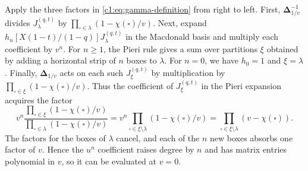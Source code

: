 \documentclass[12pt,reqno,a4paper]{amsart}
\numberwithin{equation}{section}
\numberwithin{figure}{section}
\theoremstyle{plain}
\theoremstyle{definition}
\begin{document}
Apply the three factors in \eqref{c1:eq:gamma-definition} from right to
left.  First, $\boldsymbol\Delta_{1/v}^{-1}$ divides $J_\lambda^{(q,t)}$
by $\prod_{\square\in\lambda}(1-\chi(\square)/v)$.  Next, expand
$h_n[X(1-t)/(1-q)]J_\lambda^{(q,t)}$ in the Macdonald basis and
multiply each coefficient by $v^n$.  For $n\geq1$, the Pieri rule
gives a sum over partitions $\xi$ obtained by adding a horizontal strip
of $n$ boxes to $\lambda$.
For $n=0$, we have $h_0=1$ and $\xi=\lambda$.
Finally, $\boldsymbol\Delta_{1/v}$ acts on each such $J_\xi^{(q,t)}$
by multiplication by $\prod_{\square\in\xi}(1-\chi(\square)/v)$.
Thus the coefficient of $J_\xi^{(q,t)}$ in the Pieri expansion acquires
the factor
\begin{equation}\label{eq:refaudit-gamma-polynomial-factor}
 v^n\frac{\prod_{\square\in\xi}(1-\chi(\square)/v)}
               {\prod_{\square\in\lambda}(1-\chi(\square)/v)}
 =v^n\prod_{\square\in\xi\setminus\lambda}(1-\chi(\square)/v)
 =\prod_{\square\in\xi\setminus\lambda}(v-\chi(\square)).
\end{equation}
The factors for the boxes of $\lambda$ cancel, and each of the $n$ new
boxes absorbs one factor of $v$.  Hence the $u^n$ coefficient raises
degree by $n$ and has matrix entries polynomial in $v$, so it can be
evaluated at $v=0$.
\end{document}
